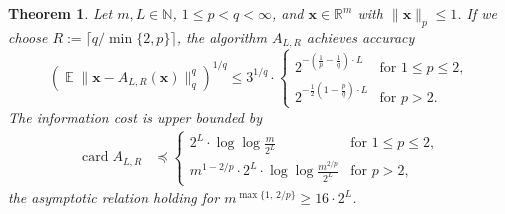 \documentclass[12pt]{article}
\theoremstyle{plain}
\newtheorem{theorem}{Theorem}[section]
\theoremstyle{definition}
\newcommand{\expect}{\operatorname{\mathbb{E}}}
\DeclareMathOperator{\card}{card}
\renewcommand{\vec}{\boldsymbol}
\newcommand{\R}{{\mathbb R}}
\newcommand{\N}{{\mathbb N}}
\begin{document}
\begin{theorem} \label{thm:A_LR}
    Let $m,L \in \N$, $1 \leq p < q < \infty$, and $\vec{x} \in \R^m$ with $\|\vec{x}\|_p \leq 1$.
    If we choose $R := \lceil q/\min\{2,p\} \rceil$,
    the algorithm $A_{L,R}$ achieves accuracy
    \begin{equation*}
        \left(\expect \|\vec{x} - A_{L,R}(\vec{x})\|_q^q\right)^{1/q}
            \leq 3^{1/q} \cdot \begin{cases}
                    2^{-\left(\frac{1}{p} - \frac{1}{q}\right) \cdot L}
                        &\text{for } 1 \leq p \leq 2,\\
                    2^{-\frac{1}{2}\left(1 - \frac{p}{q}\right) \cdot L}
                        &\text{for } p > 2.
                \end{cases}
    \end{equation*}
    The information cost is upper bounded by
    \begin{align*}
        \card A_{L,R}
            &\preceq
                \begin{cases}
                    \displaystyle 2^L \cdot \log \log \frac{m}{2^L}
                        &\text{for } 1 \leq p \leq 2, \\
                    \displaystyle m^{1-2/p} \cdot 2^L \cdot \log \log \frac{m^{2/p}}{2^L}
                        &\text{for } p > 2,
                \end{cases}
    \end{align*}
    the asymptotic relation holding for $m^{\max\{1,\,2/p\}} \geq 16 \cdot 2^L$.
\end{theorem}
\end{document}
